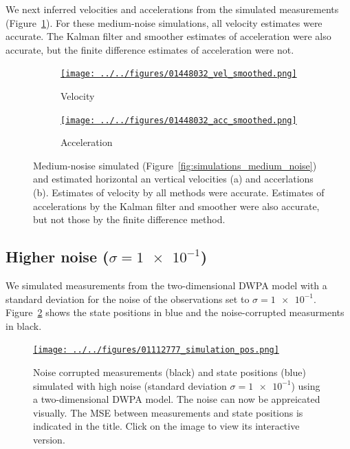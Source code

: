 \documentclass[12pt]{article}
\begin{document}
We next inferred velocities and accelerations from the simulated measurements
(Figure~\ref{fig:vel_acc_medium_noise}). For these medium-noise simulations,
all velocity estimates were accurate. The Kalman filter and smoother estimates
of acceleration were also accurate, but the finite difference estimates of
acceleration were not.

\begin{figure}

    \begin{subfigure}{\textwidth}
        \centering
        \href{http://www.gatsby.ucl.ac.uk/~rapela/fwg/lds_repo/inference/figures/01448032_vel_smoothed.html}{\texttt{[image: ../../figures/01448032\_vel\_smoothed.png]}}
        \caption{Velocity}
    \end{subfigure}

    \begin{subfigure}{\textwidth}
        \centering
        \href{http://www.gatsby.ucl.ac.uk/~rapela/fwg/lds_repo/inference/figures/01448032_acc_smoothed.html}{\texttt{[image: ../../figures/01448032\_acc\_smoothed.png]}}
        \caption{Acceleration}
    \end{subfigure}

    \caption{Medium-nosise simulated
    (Figure~\ref{fig:simulations_medium_noise}) and estimated horizontal an
    vertical velocities (a) and accerlations (b).  Estimates of velocity by all
    methods were accurate. Estimates of accelerations by the Kalman filter and
    smoother were also accurate, but not those by the finite difference
    method.}

    \label{fig:vel_acc_medium_noise}

\end{figure}

\subsection{Higher noise ($\sigma=\num{1e-1}$)}

We simulated measurements from the two-dimensional DWPA model with a standard
deviation for the noise of the observations set to $\sigma=\num{1e-1}$.
Figure~\ref{fig:simulations_high_noise} shows the state positions in blue and
the noise-corrupted measurments in black.

\begin{figure}

    \centering
    \href{http://www.gatsby.ucl.ac.uk/~rapela/fwg/lds_repo/inference/figures/01112777_simulation_pos.html}{\texttt{[image: ../../figures/01112777\_simulation\_pos.png]}}

    \caption{Noise corrupted measurements (black) and state positions (blue)
    simulated with high noise (standard deviation $\sigma=\num{1e-1}$) using a
    two-dimensional DWPA model. The noise can now be appreicated visually.  The
    MSE between measurements and state positions is indicated in the title.
    Click on the image to view its interactive version.}

    \label{fig:simulations_high_noise}

\end{figure}
\end{document}
